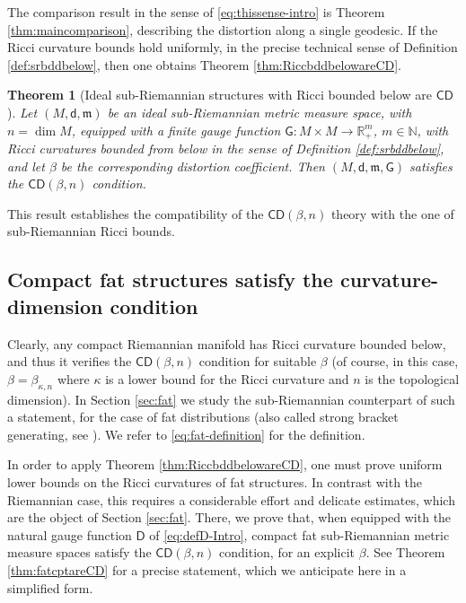 \documentclass[11pt,a4paper]{article}
\theoremstyle{plain}
\newtheorem*{theorem*}{Theorem}
\theoremstyle{definition}
\theoremstyle{remark}
\numberwithin{equation}{section}
\newcommand{\R}{\mathbb{R}} %
\newcommand{\N}{\mathbb{N}} %
\newcommand{\CD}{\mathsf{CD}}
\newcommand{\mm}{\mathfrak m}
\newcommand{\sfd}{\mathsf d}
\newcommand{\sfD}{\mathsf D}
\newcommand{\sfG}{\mathsf G}
\begin{document}
The comparison result in the sense of \eqref{eq:thissense-intro} is Theorem \ref{thm:maincomparison}, describing the distortion along a single geodesic. If the Ricci curvature bounds hold uniformly, in the precise technical sense of Definition \ref{def:srbddbelow}, then one obtains Theorem \ref{thm:RiccbddbelowareCD}.

\begin{theorem*}[Ideal sub-Riemannian structures with Ricci bounded below are $\CD$]
Let $(M,\sfd,\mm)$ be an ideal sub-Riemannian metric measure space, with $n=\dim M$, equipped with a finite gauge function $\sfG : M \times M \to \R^m_+$, $m\in \N$, with Ricci curvatures bounded from below in the sense of Definition \ref{def:srbddbelow}, and let $\beta$ be the corresponding distortion coefficient. Then $(M,\sfd,\mm,\sfG)$ satisfies the $\CD(\beta,n)$ condition.
\end{theorem*}

This result establishes the compatibility of the $\CD(\beta,n)$ theory with the one of sub-Riemannian Ricci bounds.

\subsection*{Compact fat structures satisfy the curvature-dimension condition}

Clearly, any compact Riemannian manifold has Ricci curvature bounded below, and thus it verifies the $\CD(\beta,n)$ condition for suitable $\beta$ (of course, in this case, $\beta = \beta_{\kappa,n}$ where $\kappa$ is a lower bound for the Ricci curvature and $n$ is the topological dimension). In Section \ref{sec:fat} we study the sub-Riemannian counterpart of such a statement, for the case of fat distributions (also called strong bracket generating, see \cite{montgomerybook,Strichartz}). We refer to \eqref{eq:fat-definition} for the definition.

In order to apply Theorem \ref{thm:RiccbddbelowareCD}, one must prove uniform lower bounds on the Ricci curvatures of fat structures. In contrast with the Riemannian case, this requires a considerable effort and delicate estimates, which are the object of Section \ref{sec:fat}. There, we prove that, when equipped with the natural gauge function $\sfD$ of \eqref{eq:defD-Intro}, compact fat sub-Riemannian metric measure spaces satisfy the $\CD(\beta,n)$ condition, for an explicit $\beta$. See Theorem \ref{thm:fatcptareCD} for a precise statement, which we anticipate here in a simplified form.
\end{document}
